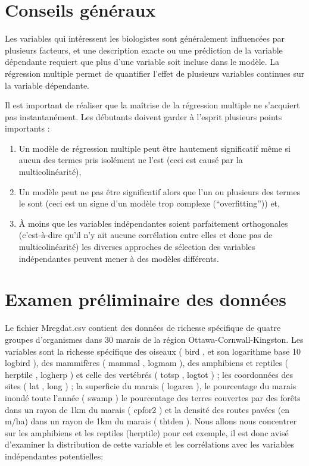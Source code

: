 \documentclass[12pt,]{book}
\providecommand{\tightlist}{%
  \setlength{\itemsep}{0pt}\setlength{\parskip}{0pt}}
\begin{document}
\hypertarget{conseils-guxe9nuxe9raux}{%
\section{Conseils généraux}\label{conseils-guxe9nuxe9raux}}

Les variables qui intéressent les biologistes sont généralement influencées par plusieurs facteurs, et une description exacte ou une prédiction de la variable dépendante requiert que plus d'une variable soit incluse dans le modèle. La régression multiple permet de quantifier l'effet de plusieurs variables continues sur la variable dépendante.

Il est important de réaliser que la maîtrise de la régression multiple ne s'acquiert pas instantanément. Les débutants doivent garder à l'esprit plusieurs points importants :

\begin{enumerate}
\def\labelenumi{\arabic{enumi}.}
\tightlist
\item
  Un modèle de régression multiple peut être hautement significatif même si aucun des termes pris isolément ne l'est (ceci est causé par la multicolinéarité),
\item
  Un modèle peut ne pas être significatif alors que l'un ou plusieurs des termes le sont (ceci est un signe d'un modèle trop complexe (``overfitting'')) et,
\item
  À moins que les variables indépendantes soient parfaitement orthogonales (c'est-à-dire qu'il n'y ait aucune corrélation entre elles et donc pas de multicolinéarité) les diverses approches de sélection des variables indépendantes peuvent mener à des modèles différents.
\end{enumerate}

\hypertarget{examen-pruxe9liminaire-des-donnuxe9es}{%
\section{Examen préliminaire des données}\label{examen-pruxe9liminaire-des-donnuxe9es}}

Le fichier Mregdat.csv contient des données de richesse spécifique de quatre groupes d'organismes dans 30 marais de la région Ottawa-Cornwall-Kingston. Les variables sont la richesse spécifique des oiseaux ( bird , et son logarithme base 10 logbird ), des mammifères ( mammal , logmam ), des amphibiens et reptiles ( herptile , logherp ) et celle des vertébrés ( totsp , logtot ) ; les coordonnées des sites ( lat , long ) ; la superficie du marais ( logarea ), le pourcentage du marais inondé toute l'année ( swamp ) le pourcentage des terres couvertes par des forêts dans un rayon de 1km du marais ( cpfor2 ) et la densité des routes pavées (en m/ha) dans un rayon de 1km du marais ( thtden ). Nous allons nous concentrer sur les amphibiens et les reptiles (herptile) pour cet exemple, il est donc avisé d'examiner la distribution de cette variable et les corrélations avec les variables indépendantes potentielles:
\end{document}
